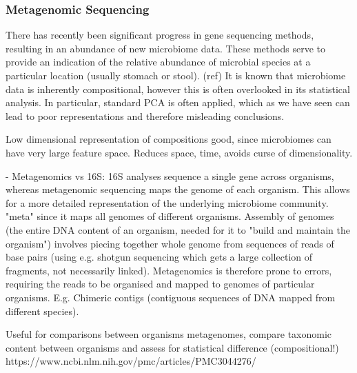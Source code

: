 \subsubsection{Metagenomic Sequencing}
\label{metagenome}




There has recently been significant progress in gene sequencing methods, resulting in an abundance of new microbiome data. These methods serve to provide an indication of the relative abundance of microbial species at a particular location (usually stomach or stool). (ref) It is known that microbiome data is inherently compositional, however this is often overlooked in its statistical analysis. In particular, standard PCA is often applied, which as we have seen can lead to poor representations and therefore misleading conclusions.  

Low dimensional representation of compositions good, since microbiomes can have very large feature space. Reduces space, time, avoids curse of dimensionality. 

- Metagenomics vs 16S: 16S analyses sequence a single gene across organisms, whereas metagenomic sequencing maps the genome of each organism. This allows for a more detailed representation of the underlying microbiome community. "meta" since it maps all genomes of different organisms. Assembly of genomes (the entire DNA content of an organism, needed for it to "build and maintain the organism") involves piecing together whole genome from sequences of reads of base pairs (using e.g. shotgun sequencing which gets a large collection of fragments, not necessarily linked). Metagenomics is therefore prone to errors, requiring the reads to be organised and mapped to genomes of particular organisms. E.g. Chimeric contigs (contiguous sequences of DNA mapped from different species).   

Useful for comparisons between organisms metagenomes, compare taxonomic content between organisms and assess for statistical difference (compositional!) https://www.ncbi.nlm.nih.gov/pmc/articles/PMC3044276/ 



